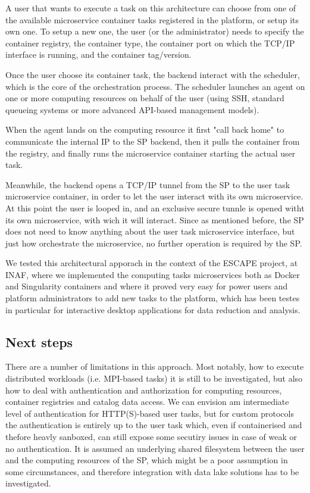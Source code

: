 \documentclass[11pt,twoside]{article}
\begin{document}

A user that wants to execute a task on this architecture can choose from one of the available microservice container tasks registered in the platform, or setup its own one. To setup a new one, the user (or the administrator) needs to specify the container registry, the container type, the container port on which the TCP/IP interface is running, and the container tag/version.

Once the user choose its container task, the backend interact with the scheduler, which is the core of the orchestration process. The scheduler launches an agent on one or more computing resources on behalf of the user (using SSH, standard queueing systems or more advanced API-based management models).

When the agent lands on the computing resource it first "call back home" to communicate the internal IP to the SP backend, then it pulls the container from the registry, and finally runs the microservice container starting the actual user task.

Meanwhile, the backend opens a TCP/IP tunnel from the SP to the user task microservice container, in order to let the user interact with its own microservice. At this point the user is looped in, and an exclusive secure tunnle is opened witht its own microservice, with wich it will interact. Since as mentioned before, the SP does not need to know anything about the user task microservice interface, but just how orchestrate the microservice, no further operation is required by the SP.

We tested this architectural apporach in the context of the ESCAPE project, at INAF, where we implemented the computing tasks microservices both as Docker and Singularity containers and where it proved very easy for power users and platform administrators to add new tasks to the platform, which has been testes in particular for interactive desktop applications for data reduction and analysis.



\subsection{Next steps}
There are a number of limitations in this approach. Most notably, how to execute distributed workloads (i.e. MPI-based tasks) it is still to be investigated, but also how to deal with authentication and authorization for computing resources, container registries and catalog data access. We can envision am intermediate level of authentication for HTTP(S)-based user tasks, but for custom protocols the authentication is entirely up to the user task which, even if containerised and thefore heavly sanboxed, can still expose some secutiry issues in case of weak or no authentication. It is assumed an underlying shared filesystem between the user and the computing resources of the SP, which might be a poor assumption in some circumstances, and therefore integration with data lake solutions has to be investigated.
\end{document}
